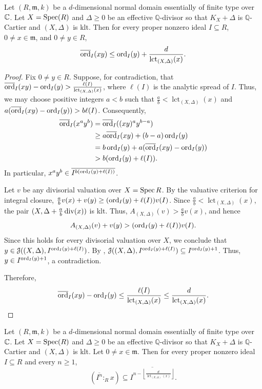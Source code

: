 \documentclass[12pt]{amsart}
\numberwithin{equation}{theorem}
\theoremstyle{plain}
\newcommand{\fm}{\mathfrak{m}}
\newcommand{\QQ}{\mathbb{Q}}
\DeclareMathOperator{\lct}{lct}
\begin{document}
\begin{lemma}\label{lem: Artin Rees bound via log canonical threshold}
    Let $(R,\fm,k)$ be a $d$-dimensional normal domain essentially of finite type over $\mathbb{C}$. Let $X=\operatorname{{Spec}}(R)$ and $\Delta\geq 0$ be an effective $\QQ$-divisor so that $K_X+\Delta$ is $\QQ$-Cartier and $(X,\Delta)$ is klt. Then for every proper nonzero ideal $I \subseteq R$, $0\not=x\in\fm$, and $0\not=y\in R$,
    \[
    \overline{\ord}_I(xy)\leq \ord_I(y) + \frac{d}{\lct_{(X,\Delta)}(x)}.
    \]
\end{lemma}
\begin{proof}
    Fix $0\neq y\in R$. Suppose, for contradiction, that
    $\overline{\ord}_I(xy)-\ord_I(y)>\frac{\ell(I)}{\lct_{(X,\Delta)}(x)}$,
    where $\ell(I)$ is the analytic spread of $I$.
    Thus, we may choose positive integers $a<b$ such that
    $\frac{a}{b}<\lct_{(X,\Delta)}(x)$ and
    $a(\overline{\operatorname{{ord}}}_I(xy)-\operatorname{{ord}}_I(y))>b\ell(I)$.
    Consequently,
    \begin{align*}
        \overline{\operatorname{{ord}}}_I(x^ay^b)
        &=\overline{\operatorname{{ord}}}_I((xy)^ay^{b-a})\\
        &\geq a\overline{\operatorname{{ord}}}_I(xy)+(b-a)\operatorname{{ord}}_I(y)\\
        &=b\operatorname{{ord}}_I(y)+a(\overline{\operatorname{{ord}}}_I(xy)-\operatorname{{ord}}_I(y))\\
        &>b(\operatorname{{ord}}_I(y)+\ell(I)).
    \end{align*}
    In particular,
    $x^ay^b\in\overline{I^{b(\operatorname{{ord}}_I(y)+\ell(I))}}$.

    Let $v$ be any divisorial valuation over $X=\operatorname{{Spec}} R$.
    By the valuative criterion for integral closure,
    $\frac{a}{b}v(x)+v(y)\geq(\operatorname{{ord}}_I(y)+\ell(I))v(I)$.
    Since $\frac{a}{b}<\lct_{(X,\Delta)}(x)$, the pair
    $(X,\Delta + \frac{a}{b}\operatorname{{div}}(x))$ is klt.
    Thus, $A_{(X,\Delta)}(v)>\frac{a}{b}v(x)$, and hence
    \[
        A_{(X,\Delta)}(v)+v(y)>(\operatorname{{ord}}_I(y)+\ell(I))v(I).
    \]
    Since this holds for every divisorial valuation over $X$,
    we conclude that
    $y\in\mathcal{J}((X,\Delta),I^{\operatorname{{ord}}_I(y)+\ell(I)})$.
    By \cite[Corollary 1.4]{LLS2008},
    $\mathcal{J}((X,\Delta),I^{\operatorname{{ord}}_I(y)+\ell(I)})
    \subseteq I^{\operatorname{{ord}}_I(y)+1}$.
    Thus, $y\in I^{\operatorname{{ord}}_I(y)+1}$, a contradiction.

    Therefore,
    \[
        \overline{\ord}_I(xy)-\ord_I(y)
        \leq\frac{\ell(I)}{\lct_{(X,\Delta)}(x)}
        \leq\frac{d}{\lct_{(X,\Delta)}(x)}.\qedhere
    \]
\end{proof}

\begin{corollary}\label{cor: Artin Rees bound via log canonical threshold}
    Let $(R,\fm,k)$ be a $d$-dimensional normal domain essentially of finite type over $\mathbb{C}$. Let $X=\operatorname{{Spec}}(R)$ and $\Delta\geq 0$ be an effective $\QQ$-divisor so that $K_X+\Delta$ is $\QQ$-Cartier and $(X,\Delta)$ is klt. Let $0 \neq x \in \fm$. Then for every proper nonzero ideal $I \subseteq R$ and every $n \geq 1$,
    \[
    \left(\overline{I^{n}}:_Rx\right)\subseteq \overline{I^{n-\left\lfloor \frac{d}{\lct_{(X,\Delta)}(x)}\right\rfloor}}.
    \]
\end{corollary}
\end{document}
